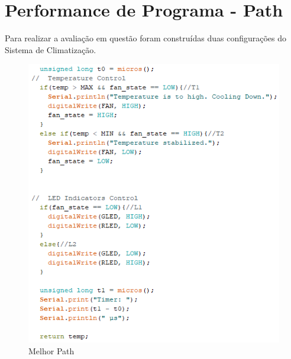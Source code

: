 \chapter{Performance de Programa - Path}

Para realizar a avaliação em questão foram construídas duas configurações do Sistema de Climatização.

\begin{figure}[H]
    \centering
    \includegraphics[scale=0.6]{images/path.png}
    \caption{Melhor Path}
    \label{fig:my_label}
\end{figure}

